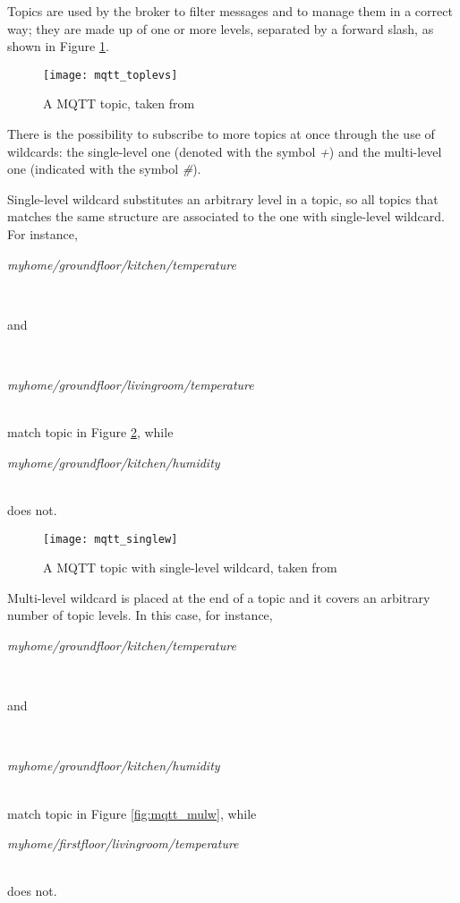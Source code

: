 Topics are used by the broker to filter messages and to manage them in a correct way; they are made up of one or more levels, separated by a forward slash, as shown in Figure \ref{fig::topic}.

\begin{figure}[ht]

    \centering
    \texttt{[image: mqtt\_toplevs]}
    \caption[A MQTT topic]{A MQTT topic, taken from \cite{site:hivemq}}
    \label{fig::topic}

\end{figure}

There is the possibility to subscribe to more topics at once through the use of wildcards: the single-level one (denoted with the symbol \textit{+}) and the multi-level one (indicated with the symbol \textit{\#}).

Single-level wildcard substitutes an arbitrary level in a topic, so all topics that matches the same structure are associated to the one with single-level wildcard.
For instance,\\
\centerline{\textit{myhome\slash{}groundfloor\slash{}kitchen\slash{}temperature}}\\
\centerline{and}\\
\centerline{\textit{myhome\slash{}groundfloor\slash{}livingroom\slash{}temperature}}\\
match topic in Figure \ref{fig:mqtt_singlew}, while\\
\centerline{\textit{myhome\slash{}groundfloor\slash{}kitchen\slash{}humidity}}\\
does not.

\begin{figure}[htb]

    \centering
    \texttt{[image: mqtt\_singlew]}
    \caption[A MQTT topic with single-level wildcard]{A MQTT topic with single-level wildcard, taken from \cite{site:hivemq}}
    \label{fig:mqtt_singlew}

\end{figure}

Multi-level wildcard is placed at the end of a topic and it covers an arbitrary number of topic levels.
In this case, for instance,\\
\centerline{\textit{myhome\slash{}groundfloor\slash{}kitchen\slash{}tem\-per\-a\-ture}}\\
\centerline{and}\\
\centerline{\textit{myhome\slash{}groundfloor\slash{}kitchen\slash{}humidity}}\\
match topic in Figure \ref{fig:mqtt_mulw}, while\\
\centerline{\textit{myhome\slash{}firstfloor\slash{}livingroom\slash{}temperature}}\\
does not.

